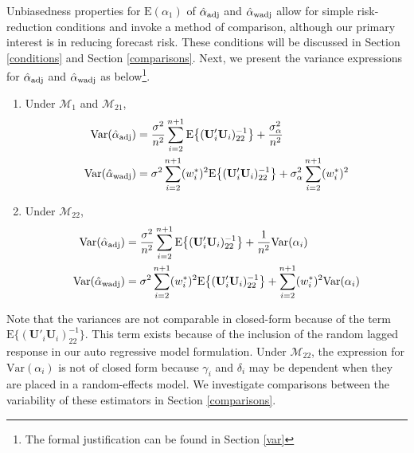 \documentclass[11pt]{article}
\def\mbf#1{\mathbf{#1}} %
\def\mrm#1{\mathrm{#1}} %
\def\mc#1{\mathcal{#1}} %
\def\E#1{\mathrm{E}(#1)} %
\def\var#1{\mathrm{Var}(#1)} %
\theoremstyle{definition}
\begin{document}
Unbiasedness properties for $\E{\alpha_1}$ of $\hat{\alpha}_{\rm adj}$ and $\hat{\alpha}_{\rm wadj}$ allow for simple risk-reduction conditions and invoke a method of comparison, although our primary interest is in reducing forecast risk. %
These conditions will be discussed in Section \ref{conditions} and Section \ref{comparisons}. Next, we present the variance expressions for $\hat{\alpha}_{\rm adj}$ and $\hat{\alpha}_{\rm wadj}$ as below\footnote{The formal justification can be found in Section \ref{var}}.

\begin{enumerate}[label = (\roman*)]
  \item Under $\mc{M}_1$ and $\mc{M}_{21}$,  
\begin{align*}
  \var{\hat{\alpha}_{\rm adj}} 
  &=\frac{\sigma^2}{n^2}\sum_{i=2}^{n+1}\mrm{E}\big\{(\mbf{U}'_i\mbf{U}_i)^{-1}_{22}\big\}+\frac{\sigma^2_{\alpha}}{n^2}\\
\var{\hat{\alpha}_{\rm wadj}}  &= \sigma^2\sum_{i=2}^{n+1}(w_i^*)^2\mrm{E}\big\{(\mbf{U}'_i\mbf{U}_i)^{-1}_{22}\big\}+\sigma^2_{\alpha}\sum_{i=2}^{n+1}(w_i^*)^2
\end{align*}
\item Under $\mc{M}_{22}$, 
\begin{align*}
\var{\hat{\alpha}_{\rm adj}} 
  &=\frac{\sigma^2}{n^2}\sum_{i=2}^{n+1}\mrm{E}\big\{(\mbf{U}'_i\mbf{U}_i)^{-1}_{22}\big\}+\frac{1}{n^2}\var{\alpha_i}\\
  \var{\hat{\alpha}_{\rm wadj}} 
  &= \sigma^2\sum_{i=2}^{n+1}(w_i^*)^2\mrm{E}\big\{(\mbf{U}'_i\mbf{U}_i)^{-1}_{22}\big\}
  + \sum_{i=2}^{n+1} (w_i^*)^2 \var{\alpha_i}
\end{align*}
\end{enumerate}
Note that the variances are not comparable in closed-form %
because of the term $\mrm{E}\big\{(\mbf{U}'_i\mbf{U}_i)^{-1}_{22}\big\}$.  This term exists because of the inclusion of the random lagged response in our auto regressive model formulation.  Under $\mc{M}_{22}$, the expression for $\var{\alpha_i}$ is not of closed form because $\gamma_i$ and $\delta_i$ may be dependent when they are placed in a random-effects model. We investigate comparisons between the variability of these estimators in Section \ref{comparisons}.%
\end{document}
